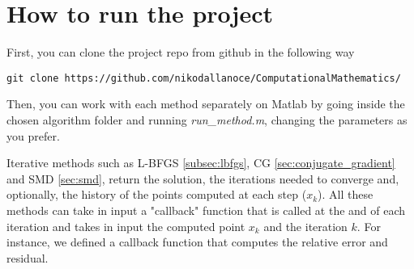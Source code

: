 \section{How to run the project}\label{sec:how_to_run_project}
First, you can clone the project repo from github in the following way
\begin{verbatim}
git clone https://github.com/nikodallanoce/ComputationalMathematics/
\end{verbatim}
Then, you can work with each method separately on Matlab by going inside the chosen algorithm folder and running \textit{run\_method.m}, changing the parameters as you prefer.
\vspace{3mm}

\noindent Iterative methods such as L-BFGS \ref{subsec:lbfgs}, CG \ref{sec:conjugate_gradient} and SMD \ref{sec:smd}, return the solution, the iterations needed to converge and, optionally, the history of the points computed at each step ($x_k$). All these methods can take in input a "callback" function that is called at the and of each iteration and takes in input the computed point $x_k$ and the iteration $k$. For instance, we defined a callback function that computes the relative error and residual.

